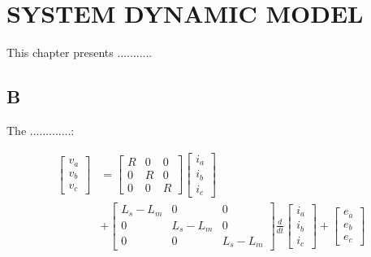 \chapter{SYSTEM DYNAMIC MODEL} 
\label{chapter:SystemMathematicalModeling}


\ifpdf
    \graphicspath{{4_SystemMathematicalModeling/figures/PNG/}{4_SystemMathematicalModeling/figures/PDF/}{4_SystemMathematicalModeling/figures/}}
\else
    \graphicspath{{4_SystemMathematicalModeling/figures/EPS/}{4_SystemMathematicalModeling/figures/}}
\fi


This chapter presents ...........
\section{B}
\noindent The .............:

\begin{equation}
\label{eq1BLDC}
\begin{split}
\left[\begin{array}{c} v_a \\ v_b \\ v_c \end{array}\right] & = \begin{bmatrix}
R & 0 & 0 \\
0 & R & 0 \\
0 & 0 & R
\end{bmatrix}  \left[ \begin{array}{c} i_a \\ i_b \\ i_c \end{array} \right]\\
& +\begin{bmatrix}
L_s-L_m & 0 & 0 \\
0 & L_s-L_m & 0 \\
0 & 0 & L_s-L_m
\end{bmatrix} \frac{d}{dt} \left[ \begin{array}{c} i_a \\ i_b \\ i_c \end{array} \right] + \left[ \begin{array}{c} e_a \\ e_b \\ e_c \end{array} \right] 
\end{split}
\end{equation}

